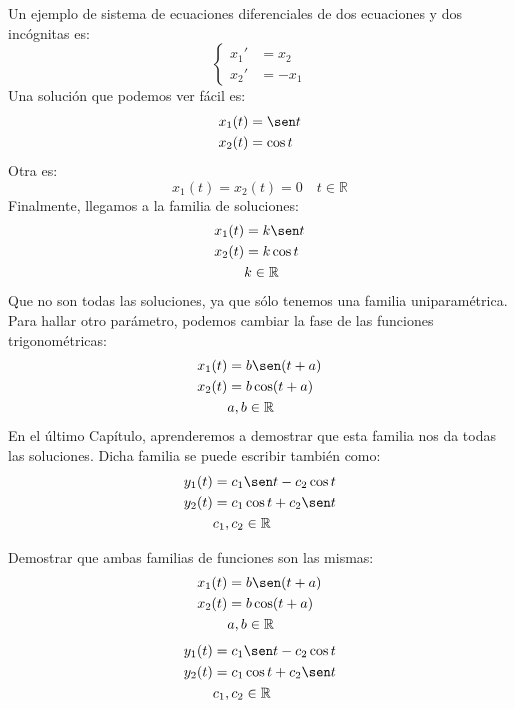 \begin{ejemplo}
    Un ejemplo de sistema de ecuaciones diferenciales de dos ecuaciones y dos incógnitas es:
    \begin{equation*}
        \left\{\begin{array}{rl}
                x_1' &= x_2 \\
                x_2' &= -x_1
        \end{array}\right.
    \end{equation*}
    Una solución que podemos ver fácil es:
    \begin{align*}
        x_1(t) &= \sen t \\
        x_2(t) &= \cos t
    \end{align*}
    Otra es:
    \begin{equation*}
        x_1(t) = x_2(t) = 0 \quad t\in \mathbb{R}
    \end{equation*}
    Finalmente, llegamos a la familia de soluciones:
    \begin{align*}
        x_1(t) &= k \sen t \\
        x_2(t) &= k \cos t \\
               &k \in \mathbb{R}
    \end{align*}
    Que no son todas las soluciones, ya que sólo tenemos una familia uniparamétrica. Para hallar otro parámetro, podemos cambiar la fase de las funciones trigonométricas:
    \begin{align*}
        x_1(t) &= b \sen (t+a) \\
        x_2(t) &= b \cos (t+a) \\
               &a,b \in \mathbb{R}
    \end{align*}
    En el último Capítulo, aprenderemos a demostrar que esta familia nos da todas las soluciones. Dicha familia se puede escribir también como:
    \begin{align*}
        y_1(t) &= c_1 \sen t - c_2 \cos t \\
        y_2(t) &= c_1 \cos t + c_2 \sen t \\
               & c_1, c_2 \in \mathbb{R}
    \end{align*}
\end{ejemplo}

\begin{ejercicio}
    Demostrar que ambas familias de funciones son las mismas:
    \begin{align*}
        x_1(t) &= b \sen (t+a) \\
        x_2(t) &= b \cos (t+a) \\
               &a,b \in \mathbb{R}
    \end{align*}
    \begin{align*}
        y_1(t) &= c_1 \sen t - c_2 \cos t \\
        y_2(t) &= c_1 \cos t + c_2 \sen t \\
               & c_1, c_2 \in \mathbb{R}
    \end{align*}
\end{ejercicio}

